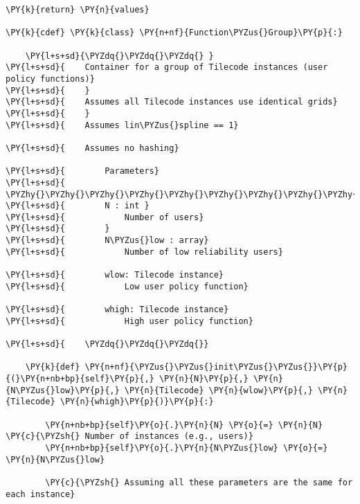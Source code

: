 \begin{Verbatim}[commandchars=\\\{\}]
        \PY{k}{return} \PY{n}{values}

\PY{k}{cdef} \PY{k}{class} \PY{n+nf}{Function\PYZus{}Group}\PY{p}{:}

    \PY{l+s+sd}{\PYZdq{}\PYZdq{}\PYZdq{} }
\PY{l+s+sd}{    Container for a group of Tilecode instances (user policy functions)}
\PY{l+s+sd}{    }
\PY{l+s+sd}{    Assumes all Tilecode instances use identical grids}
\PY{l+s+sd}{    }
\PY{l+s+sd}{    Assumes lin\PYZus{}spline == 1}

\PY{l+s+sd}{    Assumes no hashing}

\PY{l+s+sd}{        Parameters}
\PY{l+s+sd}{        \PYZhy{}\PYZhy{}\PYZhy{}\PYZhy{}\PYZhy{}\PYZhy{}\PYZhy{}\PYZhy{}\PYZhy{}\PYZhy{}\PYZhy{}}
\PY{l+s+sd}{        N : int }
\PY{l+s+sd}{            Number of users}
\PY{l+s+sd}{        }
\PY{l+s+sd}{        N\PYZus{}low : array}
\PY{l+s+sd}{            Number of low reliability users}

\PY{l+s+sd}{        wlow: Tilecode instance}
\PY{l+s+sd}{            Low user policy function}

\PY{l+s+sd}{        whigh: Tilecode instance}
\PY{l+s+sd}{            High user policy function}

\PY{l+s+sd}{    \PYZdq{}\PYZdq{}\PYZdq{}}

    \PY{k}{def} \PY{n+nf}{\PYZus{}\PYZus{}init\PYZus{}\PYZus{}}\PY{p}{(}\PY{n+nb+bp}{self}\PY{p}{,} \PY{n}{N}\PY{p}{,} \PY{n}{N\PYZus{}low}\PY{p}{,} \PY{n}{Tilecode} \PY{n}{wlow}\PY{p}{,} \PY{n}{Tilecode} \PY{n}{whigh}\PY{p}{)}\PY{p}{:}
        
        \PY{n+nb+bp}{self}\PY{o}{.}\PY{n}{N} \PY{o}{=} \PY{n}{N}                                   \PY{c}{\PYZsh{} Number of instances (e.g., users)}
        \PY{n+nb+bp}{self}\PY{o}{.}\PY{n}{N\PYZus{}low} \PY{o}{=} \PY{n}{N\PYZus{}low}

        \PY{c}{\PYZsh{} Assuming all these parameters are the same for each instance}


\end{Verbatim}

